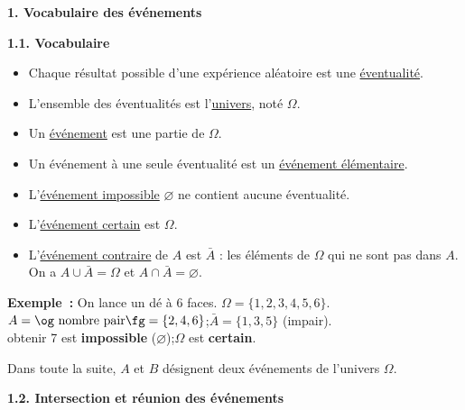 \documentclass[11pt,a4paper]{article}
\newcommand{\cor}[1]{%
  \begin{tcolorbox}[
    colback=blue!5!white,
    colframe=blue!70!black,
    boxrule=1pt,
    arc=3pt,
    left=4pt, right=4pt, top=3pt, bottom=3pt,
    before skip=2mm, after skip=3mm
  ]
  \color{blue!80!black}#1
  \end{tcolorbox}%
}
\begin{document}
\begin{mybox}
\begin{center}\textbf{1. Vocabulaire des événements}\end{center}
\end{mybox}

\begin{mybox}
\begin{center}\textbf{1.1. Vocabulaire}\end{center}
\end{mybox}

\begin{itemize}[label=]
  \item Chaque résultat possible d'une expérience aléatoire est une \underline{éventualité}.
  \item L'ensemble des éventualités est l'\underline{univers}, noté $\Omega$.
  \item Un \underline{événement} est une partie de $\Omega$.
  \item Un événement à une seule éventualité est un \underline{événement élémentaire}.
  \item L'\underline{événement impossible} $\varnothing$ ne contient aucune éventualité.
  \item L'\underline{événement certain} est $\Omega$.
  \item L'\underline{événement contraire} de $A$ est $\bar{A}$ : les éléments de $\Omega$ qui ne sont pas dans $A$. On a $A\cup\bar{A}=\Omega$ et $A\cap\bar{A}=\varnothing$.
\end{itemize}

\cor{%
\textbf{Exemple~:} On lance un dé à 6 faces. $\Omega=\{1,2,3,4,5,6\}$.\\
$A=\text{\og nombre pair\fg}=\{2,4,6\}$\quad;\quad$\bar{A}=\{1,3,5\}$ (impair).\\
\og obtenir 7\fg{} est \textbf{impossible} ($\varnothing$)\quad;\quad$\Omega$ est \textbf{certain}.}

Dans toute la suite, $A$ et $B$ désignent deux événements de l'univers $\Omega$.

\newpage

\begin{mybox}
\begin{center}\textbf{1.2. Intersection et réunion des événements}\end{center}
\end{mybox}

\end{document}
